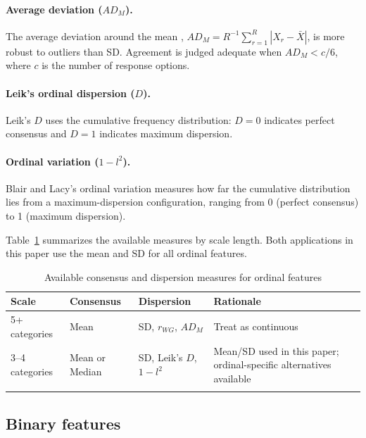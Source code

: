 \documentclass[referee,lineno,pdflatex,sn-vancouver-num]{sn-jnl}
\begin{document}
\begin{appendices}
\paragraph{Average deviation ($AD_M$).}
The average deviation around the mean \cite{Burke1999},
$AD_M = R^{-1}\sum_{r=1}^R |X_r - \bar X|$,
is more robust to outliers than SD. Agreement is judged adequate when $AD_M < c/6$, where $c$ is the number of response options.

\paragraph{Leik's ordinal dispersion ($D$).}
Leik's $D$ \cite{Leik1966} uses the cumulative frequency distribution: $D = 0$ indicates perfect consensus and $D = 1$ indicates maximum dispersion.

\paragraph{Ordinal variation ($1 - l^2$).}
Blair and Lacy's ordinal variation \cite{Blair2000} measures how far the cumulative distribution lies from a maximum-dispersion configuration, ranging from 0 (perfect consensus) to 1 (maximum dispersion).

Table~\ref{tab:ordinal_summary} summarizes the available measures by scale length. Both applications in this paper use the mean and SD for all ordinal features.

\begin{table}[h]
\caption{Available consensus and dispersion measures for ordinal features}\label{tab:ordinal_summary}
\small
\renewcommand{\arraystretch}{1.2}
\begin{tabular*}{\textwidth}{@{\extracolsep\fill}ll l p{}}
\toprule
Scale & Consensus & Dispersion & Rationale \\
\midrule
5+ categories & Mean & SD, $r_{WG}$, $AD_M$ & Treat as continuous \\
3--4 categories & Mean or Median & SD, Leik's $D$, $1-l^2$ & Mean/SD used in this paper; ordinal-specific alternatives available \\
\botrule
\end{tabular*}
\end{table}

\subsection{Binary features}\label{secA4}


\end{appendices}
\end{document}
